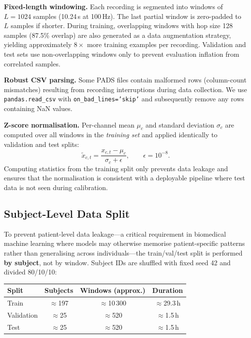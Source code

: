 \documentclass{article}
\begin{document}
\textbf{Fixed-length windowing.}
Each recording is segmented into windows of $L = 1024$ samples
(10.24\,s at 100\,Hz).
The last partial window is zero-padded to $L$ samples if shorter.
During training, overlapping windows with hop size 128 samples (87.5\% overlap)
are also generated as a data augmentation strategy, yielding approximately
$8\times$ more training examples per recording.
Validation and test sets use non-overlapping windows only to prevent evaluation
inflation from correlated samples.

\textbf{Robust CSV parsing.}
Some PADS files contain malformed rows (column-count mismatches) resulting from
recording interruptions during data collection.
We use \texttt{pandas.read\_csv} with \texttt{on\_bad\_lines='skip'} and
subsequently remove any rows containing NaN values.

\textbf{Z-score normalisation.}
Per-channel mean $\mu_c$ and standard deviation $\sigma_c$ are computed over
all windows in the \emph{training set} and applied identically to validation
and test splits:
%
\begin{equation}
  \tilde{x}_{c,t} = \frac{x_{c,t} - \mu_c}{\sigma_c + \epsilon},
  \qquad \epsilon = 10^{-8}.
\end{equation}
%
Computing statistics from the training split only prevents data leakage and
ensures that the normalisation is consistent with a deployable pipeline where
test data is not seen during calibration.

\subsection{Subject-Level Data Split}

To prevent patient-level data leakage---a critical requirement in biomedical
machine learning where models may otherwise memorise patient-specific patterns
rather than generalising across individuals---the train/val/test split is
performed \textbf{by subject}, not by window.
Subject IDs are shuffled with fixed seed 42 and divided 80/10/10:

\begin{center}
\begin{tabular}{lccc}
\toprule
\textbf{Split} & \textbf{Subjects} & \textbf{Windows (approx.)} & \textbf{Duration} \\
\midrule
Train & $\approx$197 & $\approx$10\,300 & $\approx$29.3\,h \\
Validation & $\approx$25 & $\approx$520 & $\approx$1.5\,h \\
Test & $\approx$25 & $\approx$520 & $\approx$1.5\,h \\
\bottomrule
\end{tabular}
\end{center}
\end{document}
